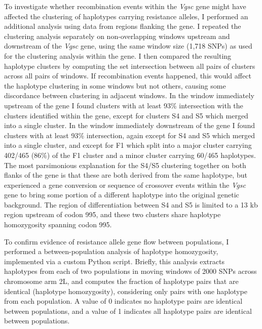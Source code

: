 \documentclass[a4paper,11pt,abstracton,hidelinks]{scrartcl}
\begin{document}
To investigate whether recombination events within the \textit{Vgsc} gene might have affected the clustering of haplotypes carrying resistance alleles, I performed an additional analysis using data from regions flanking the gene.
%
I repeated the clustering analysis separately on non-overlapping windows upstream and downstream of the \textit{Vgsc} gene, using the same window size (1,718 SNPs) as used for the clustering analysis within the gene.
%
I then compared the resulting haplotype clusters by computing the set intersection between all pairs of clusters across all pairs of windows.
%
If recombination events happened, this would affect the haplotype clustering in some windows but not others, causing some discordance between clustering in adjacent windows.
%
In the window immediately upstream of the gene I found clusters with at least 93\% intersection with the clusters identified within the gene, except for clusters S4 and S5 which merged into a single cluster.
%
In the window immediately downstream of the gene I found clusters with at least 93\% intersection, again except for S4 and S5 which merged into a single cluster, and except for F1 which split into a major cluster carrying 402/465 (86\%) of the F1 cluster and a minor cluster carrying 60/465 haplotypes.
%
The most parsimonious explanation for the S4/S5 clustering together on both flanks of the gene is that these are both derived from the same haplotype, but experienced a gene conversion or sequence of crossover events within the \textit{Vgsc} gene to bring some portion of a different haplotype into the original genetic background.
%
The region of differentiation between S4 and S5 is limited to a 13 kb region upstream of codon 995, and these two clusters share haplotype homozygosity spanning codon 995.


To confirm evidence of resistance allele gene flow between populations, I performed a between-population analysis of haplotype homozygosity, implemented via a custom Python script.
%
Briefly, this analysis extracts haplotypes from each of two populations in moving windows of 2000 SNPs across chromosome arm 2L, and computes the fraction of haplotype pairs that are identical (haplotype homozygosity), considering only pairs with one haplotype from each population.
%
A value of 0 indicates no haplotype pairs are identical between populations, and a value of 1 indicates all haplotype pairs are identical between populations.


\end{document}
